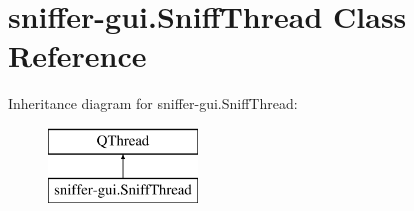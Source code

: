 \hypertarget{classsniffer-gui_1_1SniffThread}{\section{sniffer-\/gui.Sniff\-Thread Class Reference}
\label{classsniffer-gui_1_1SniffThread}
}
Inheritance diagram for sniffer-\/gui.Sniff\-Thread\-:\begin{figure}[H]
\begin{center}
\leavevmode
\includegraphics[height=2.000000cm]{classsniffer-gui_1_1SniffThread}
\end{center}
\end{figure}
